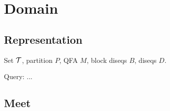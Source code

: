 \chapter{Domain}

\section{Representation}

Set $\mathcal{T}$, partition $P$, QFA $M$, block diseqs $B$, diseqs $D$.

Query: ...

\section{Meet}




